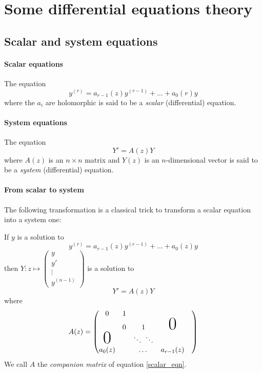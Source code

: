 \documentclass[../main.tex]{subfiles}
\begin{document}
\section{Some differential equations theory}

\subsection{Scalar and system equations}

\paragraph{Scalar equations}

The equation
\begin{equation}\label{scalar_eq}
	y^{(r)} = a_{r - 1}(z) y^{(r - 1)} + \dots + a_0(r) y
\end{equation}
where the $a_i$ are holomorphic is said to be a \emph{scalar} (differential) equation.

\paragraph{System equations}

The equation
\begin{equation}\label{system_eq}
	Y' = A(z) Y
\end{equation}
where $A(z)$ is an $n \times n$ matrix and $Y(z)$ is an $n$-dimensional vector
is said to be a \emph{system} (differential) equation.

\paragraph{From scalar to system}

The following transformation is a classical trick to transform a scalar equation into a system one:

If $y$ is a solution to 
\begin{equation*}\label{scalar_eqn}
	y^{(r)} = a_{r - 1}(z) y^{(r - 1)} + \dots + a_0(z) y
\end{equation*}
then
$Y : z \mapsto \begin{pmatrix}
y\\
y'\\
\vdots \\
y^{(n - 1)}
\end{pmatrix}$
is a solution to
\begin{equation*}
	Y' = A(z)Y
\end{equation*} where
\begin{equation*}
A(z)=
\begin{pmatrix}
0&1&&&\\
 &0&1&\mbox{\Huge 0}\\
 \mbox{\Huge 0}& &\ddots ~ \ddots\\
a_0(z) & & \dots & a_{r - 1}(z)
\end{pmatrix}
\end{equation*}
We call $A$ the \emph{companion matrix} of equation \eqref{scalar_eqn}.
\end{document}
